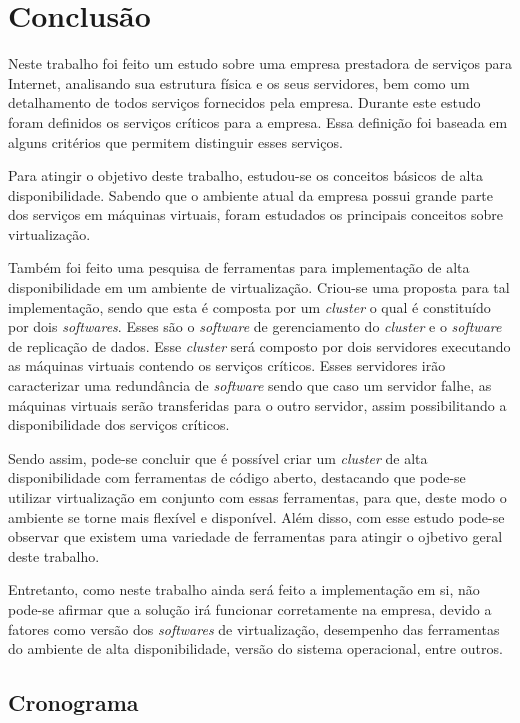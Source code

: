 \chapter{Conclusão}
\label{cap:conclusao}

Neste trabalho foi feito um estudo sobre uma empresa prestadora de serviços para Internet, analisando sua estrutura física e os seus servidores, 
bem como um detalhamento de todos serviços fornecidos pela empresa. Durante este estudo foram definidos os serviços críticos para a empresa.
Essa definição foi baseada em alguns critérios que permitem distinguir esses serviços.

Para atingir o objetivo deste trabalho, estudou-se os conceitos básicos de alta disponibilidade. Sabendo que o ambiente atual da empresa possui 
grande parte dos serviços em máquinas virtuais, foram estudados os principais conceitos sobre virtualização.

Também foi feito uma pesquisa de ferramentas para implementação de alta disponibilidade em um ambiente de virtualização. Criou-se uma proposta 
para tal implementação, sendo que esta é composta por um \textit{cluster} o qual é constituído por dois \textit{softwares}. Esses são o 
\textit{software} de gerenciamento do \textit{cluster} e o \textit{software} de replicação de dados. %
Esse \textit{cluster} será composto por dois servidores executando as máquinas virtuais contendo os serviços críticos. Esses servidores 
irão caracterizar uma redundância de \textit{software} sendo que caso um servidor falhe, as máquinas virtuais serão transferidas para o outro
servidor, assim possibilitando a disponibilidade dos serviços críticos.

Sendo assim, pode-se concluir que é possível criar um \textit{cluster} de alta disponibilidade com ferramentas de código aberto, destacando que 
pode-se utilizar virtualização em conjunto com essas ferramentas, para que, deste modo o ambiente se torne mais flexível e disponível. 
Além disso, com esse estudo pode-se observar que existem uma variedade de ferramentas para atingir o ojbetivo geral deste trabalho.

Entretanto, como neste trabalho ainda será feito a implementação em si, não pode-se afirmar que a solução irá funcionar corretamente
na empresa, devido a fatores como versão dos \textit{softwares} de virtualização, desempenho das ferramentas do ambiente de alta disponibilidade, 
versão do sistema operacional, entre outros.

\newpage
\section{Cronograma}
\label{section:cronograma}

